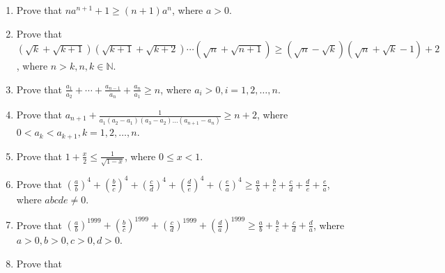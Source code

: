 \begin{enumerate}
\item Prove that $na^{n + 1} + 1 \geq (n + 1)a^n$, where $a > 0$.
\item Prove that $\left(\sqrt{k} + \sqrt{k + 1}\right)\left(\sqrt{k + 1} + \sqrt{k + 2}\right)\cdots\left(\sqrt{n} + \sqrt{n +
  1}\right)\geq\left(\sqrt{n} - \sqrt{k}\right)\left(\sqrt{n} + \sqrt{k} - 1\right) + 2$, where $n > k, n, k\in\mathbb{N}$.
\item Prove that $\frac{a_1}{a_2} + \cdots + \frac{a_{n - 1}}{a_n} + \frac{a_n}{a_1}\geq n$, where $a_i > 0, i = 1, 2, \ldots, n$.
\item Prove that $a_{n + 1} + \frac{1}{a_1(a_2 - a_1)(a_3 - a_2)\ldots(a_{n + 1} - a_n)}\geq n + 2$, where $0 < a_k < a_{k + 1}, k
  = 1, 2, \ldots, n$.
\item Prove that $1 + \frac{x}{2}\leq\frac{1}{\sqrt{1 - x}}$, where $0\leq x < 1$.
\item Prove that $\left(\frac{a}{b}\right)^4 + \left(\frac{b}{c}\right)^4 + \left(\frac{c}{d}\right)^4 + \left(\frac{d}{e}\right)^4
  + \left(\frac{e}{a}\right)^4 \geq \frac{a}{b} + \frac{b}{c} + \frac{c}{d} + \frac{d}{e} + \frac{e}{a}$, where $abcde\neq 0$.
\item Prove that $\left(\frac{a}{b}\right)^{1999} + \left(\frac{b}{c}\right)^{1999} + \left(\frac{c}{d}\right)^{1999} +
  \left(\frac{d}{a}\right)^{1999}\geq \frac{a}{b} + \frac{b}{c} + \frac{c}{d} + \frac{d}{a}$, where $a > 0, b > 0, c > 0, d > 0$.
\item Prove that
\end{enumerate}
